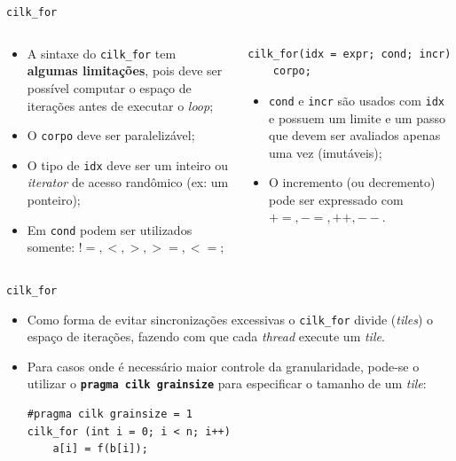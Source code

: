 \documentclass{beamer}
\begin{document}
\begin{frame}[fragile]{\texttt{cilk\_for}}
\begin{columns}[T]
\begin{column}{0.5\textwidth}
\begin{itemize}
    \item<+-> A sintaxe do \texttt{cilk\_for} tem \textbf{algumas limitações},
    pois deve ser possível computar o espaço de iterações antes de executar o
    \textit{loop};
    \item<+-> O \texttt{corpo} deve ser paralelizável;
    \item<+-> O tipo de \texttt{idx} deve ser um inteiro ou \textit{iterator} de
    acesso randômico (ex: um ponteiro);
    \item<+-> Em \texttt{cond} podem ser utilizados somente: ${ !=, <, >, >=, <= }$;
\end{itemize}
\end{column}

\begin{column}{0.5\textwidth}
\begin{block}{}
\begin{lstlisting}
cilk_for(idx = expr; cond; incr)
    corpo;
\end{lstlisting}
\end{block}
\begin{itemize}
    \item<+-> \texttt{cond} e \texttt{incr} são usados com \texttt{idx} e possuem um
    limite e um passo que devem ser avaliados apenas uma vez (imutáveis);
    \item<+-> O incremento (ou decremento) pode ser expressado com ${ +=, -=, ++,
    --}$.
\end{itemize}
\end{column}

\end{columns}
\end{frame}

\begin{frame}[fragile]{\texttt{cilk\_for}}
\begin{itemize}
    \item Como forma de evitar sincronizações excessivas o 
    \texttt{cilk\_for} divide (\textit{tiles}) o espaço de iterações, fazendo 
    com que cada \textit{thread} execute um \textit{tile}.
    \item Para casos onde é necessário maior controle da granularidade,
    pode-se o utilizar o \textbf{\texttt{pragma cilk grainsize}} para
    especificar o tamanho de um \textit{tile}:
\pause
\begin{lstlisting}
#pragma cilk grainsize = 1
cilk_for (int i = 0; i < n; i++)
    a[i] = f(b[i]);
\end{lstlisting}
\end{itemize}

\end{frame}
\end{document}
